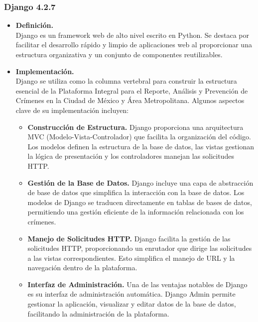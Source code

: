 \documentclass{article}
\begin{document}
        \subsubsection{Django 4.2.7}
            \begin{itemize}
                \item \textbf{Definición.}\\
                Django es un framework web de alto nivel escrito en Python. Se destaca por facilitar el desarrollo rápido y limpio de aplicaciones web al proporcionar una estructura organizativa y un conjunto de componentes reutilizables.

                \item \textbf{Implementación.}\\
                Django se utiliza como la columna vertebral para construir la estructura esencial de la Plataforma Integral para el Reporte, Análisis y Prevención de Crímenes en la Ciudad de México y Área Metropolitana. Algunos aspectos clave de su implementación incluyen:

                \begin{itemize}
                    \item \textbf{Construcción de Estructura.}
                    Django proporciona una arquitectura MVC (Modelo-Vista-Controlador) que facilita la organización del código. Los modelos definen la estructura de la base de datos, las vistas gestionan la lógica de presentación y los controladores manejan las solicitudes HTTP.

                    \item \textbf{Gestión de la Base de Datos.}
                    Django incluye una capa de abstracción de base de datos que simplifica la interacción con la base de datos. Los modelos de Django se traducen directamente en tablas de bases de datos, permitiendo una gestión eficiente de la información relacionada con los crímenes.

                    \item \textbf{Manejo de Solicitudes HTTP.}
                    Django facilita la gestión de las solicitudes HTTP, proporcionando un enrutador que dirige las solicitudes a las vistas correspondientes. Esto simplifica el manejo de URL y la navegación dentro de la plataforma.

                    \item \textbf{Interfaz de Administración.}
                    Una de las ventajas notables de Django es su interfaz de administración automática. Django Admin permite gestionar la aplicación, visualizar y editar datos de la base de datos, facilitando la administración de la plataforma.
                \end{itemize}


\end{itemize}
\end{document}
